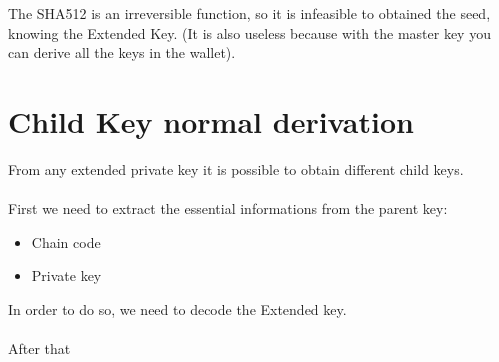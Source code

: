 \begin{remark}
	The SHA512 is an irreversible function, so it is infeasible to obtained the seed, knowing the Extended Key. (It is also useless because with the master key you can derive all the keys in the wallet).
\end{remark}

\section{Child Key normal derivation}
From any extended private key it is possible to obtain different child keys.
\\ \\
First we need to extract the essential informations from the parent key:
\begin{itemize}[label=$\star$]
	\item Chain code
	\item Private key
\end{itemize}
In order to do so, we need to decode the Extended key.
\\ \\
After that 






